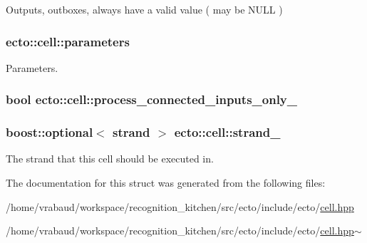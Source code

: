 Outputs, outboxes, always have a valid value ( may be N\-U\-L\-L ) 

\hypertarget{structecto_1_1cell_ae00a91199c758cf7c24dcf0ecdf70a27}{
\subsubsection[{parameters}]{ ecto\-::cell\-::parameters}}\label{structecto_1_1cell_ae00a91199c758cf7c24dcf0ecdf70a27}


Parameters. 

\hypertarget{structecto_1_1cell_a9a9d7fa3bb72fd74073a997bfb6cbad8}{
\subsubsection[{process\-\_\-connected\-\_\-inputs\-\_\-only\-\_\-}]{\setlength{\rightskip}{0pt plus 5cm}bool ecto\-::cell\-::process\-\_\-connected\-\_\-inputs\-\_\-only\-\_\-\hspace{0.3cm}{\ttfamily [private]}}}\label{structecto_1_1cell_a9a9d7fa3bb72fd74073a997bfb6cbad8}
\hypertarget{structecto_1_1cell_a0ecc893a5427877548d0c39a208a5a26}{
\subsubsection[{strand\-\_\-}]{\setlength{\rightskip}{0pt plus 5cm}boost\-::optional$<$ {\bf strand} $>$ ecto\-::cell\-::strand\-\_\-}}\label{structecto_1_1cell_a0ecc893a5427877548d0c39a208a5a26}


The strand that this cell should be executed in. 



The documentation for this struct was generated from the following files\-:\begin{DoxyCompactItemize}
\item 
/home/vrabaud/workspace/recognition\-\_\-kitchen/src/ecto/include/ecto/\hyperlink{cell_8hpp}{cell.\-hpp}\item 
/home/vrabaud/workspace/recognition\-\_\-kitchen/src/ecto/include/ecto/\hyperlink{cell_8hpp~}{cell.\-hpp$\sim$}\end{DoxyCompactItemize}
